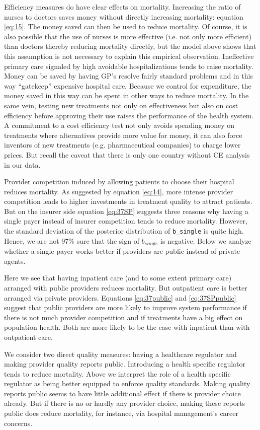 \documentclass[a4paper,12pt]{article}
\begin{document}
Efficiency measures do have clear effects on mortality. Increasing the ratio of nurses to doctors saves money without directly increasing mortality: equation \eqref{eq:15}. The money saved can then be used to reduce mortality. Of course, it is also possible that the use of nurses is more effective (i.e. not only more efficient) than doctors thereby reducing mortality directly, but the model above shows that this assumption is not necessary to explain this empirical observation. Ineffective primary care signaled by high avoidable hospitalizations tends to raise mortality. Money can be saved by having GP's resolve fairly standard problems and in this way ``gatekeep'' expensive hospital care. Because we control for expenditure, the money saved in this way can be spent in other ways to reduce mortality. In the same vein, testing new treatments not only on effectiveness but also on cost efficiency before approving their use raises the performance of the health system. A commitment to a cost efficiency test not only avoids spending money on treatments where alternatives provide more value for money, it can also force inventors of new treatments (e.g. pharmaceutical companies) to charge lower prices. But recall the caveat that there is only one country without CE analysis in our data.

Provider competition induced by allowing patients to choose their hospital reduces mortality. As suggested by equation \eqref{eq:14}, more intense provider competition leads to higher investments in treatment quality to attract patients. But on the insurer side equation \eqref{eq:37SP} suggests three reasons why having a single payer instead of insurer competition tends to reduce mortality. However, the standard deviation of the posterior distribution of \texttt{b\_single} is quite high. Hence, we are not 97\% sure that the sign of \(b_{single}\) is negative. Below we analyze whether a single payer works better if providers are public instead of private agents.

Here we see that having inpatient care (and to some extent primary care) arranged with public providers reduces mortality. But outpatient care is better arranged via private providers. Equations \eqref{eq:37public} and \eqref{eq:37SPpublic} suggest that public providers are more likely to improve system performance if there is not much provider competition and if treatments have a big effect on population health. Both are more likely to be the case with inpatient than with outpatient care.

We consider two direct quality measures: having a healthcare regulator and making provider quality reports public. Introducing a health specific regulator tends to reduce mortality. Above we interpret the role of a health specific regulator as being better equipped to enforce quality standards. Making quality reports public seems to have little additional effect if there is provider choice already. But if there is no or hardly any provider choice, making these reports public does reduce mortality, for instance, via hospital management's career concerns.
\end{document}
